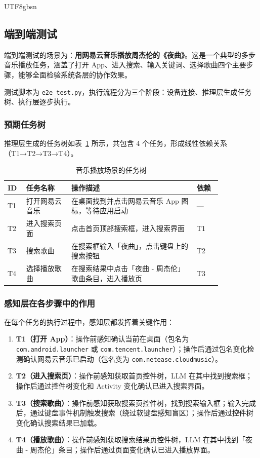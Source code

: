 \documentclass{article}
\begin{document}
\begin{CJK}{UTF8}{gbsn}
\subsection{端到端测试}

端到端测试的场景为：\textbf{用网易云音乐播放周杰伦的《夜曲》}。这是一个典型的多步音乐播放任务，涵盖了打开 App、进入搜索、输入关键词、选择歌曲四个主要步骤，能够全面检验系统各层的协作效果。

测试脚本为 \texttt{e2e\_test.py}，执行流程分为三个阶段：设备连接、推理层生成任务树、执行层逐步执行。

\subsubsection{预期任务树}

推理层生成的任务树如表~\ref{tab:e2e_tasks} 所示，共包含 4 个任务，形成线性依赖关系（T1→T2→T3→T4）。

\begin{table}[h]
  \centering
  \caption{音乐播放场景的任务树}
  \label{tab:e2e_tasks}
  \begin{tabular}{p{0.06\linewidth}p{0.18\linewidth}p{0.5\linewidth}p{0.1\linewidth}}
    \toprule
    ID & 任务名称 & 操作描述 & 依赖 \\
    \midrule
    T1 & 打开网易云音乐 & 在桌面找到并点击网易云音乐 App 图标，等待应用启动 & — \\
    T2 & 进入搜索页面 & 点击首页顶部搜索框，进入搜索界面 & T1 \\
    T3 & 搜索歌曲 & 在搜索框输入「夜曲」，点击键盘上的搜索按钮 & T2 \\
    T4 & 选择播放歌曲 & 在搜索结果中点击「夜曲 - 周杰伦」歌曲条目，进入播放页 & T3 \\
    \bottomrule
  \end{tabular}
\end{table}

\subsubsection{感知层在各步骤中的作用}

在每个任务的执行过程中，感知层都发挥着关键作用：

\begin{enumerate}[leftmargin=1.5em]
  \item \textbf{T1（打开 App）}：操作前感知确认当前在桌面（包名为 \texttt{com.android.launcher} 或 \texttt{com.tencent.launcher}）；操作后通过包名变化检测确认网易云音乐已启动（包名变为 \texttt{com.netease.cloudmusic}）。
  \item \textbf{T2（进入搜索页）}：操作前感知获取首页控件树，LLM 在其中找到搜索框；操作后通过控件树变化和 Activity 变化确认已进入搜索界面。
  \item \textbf{T3（搜索歌曲）}：操作前感知获取搜索页控件树，找到搜索输入框；输入完成后，通过键盘事件机制触发搜索（绕过软键盘感知盲区）；操作后通过控件树变化确认搜索结果已加载。
  \item \textbf{T4（播放歌曲）}：操作前感知获取搜索结果页控件树，LLM 在其中找到「夜曲 - 周杰伦」条目；操作后通过页面变化确认已进入播放界面。
\end{enumerate}


\end{CJK}
\end{document}
